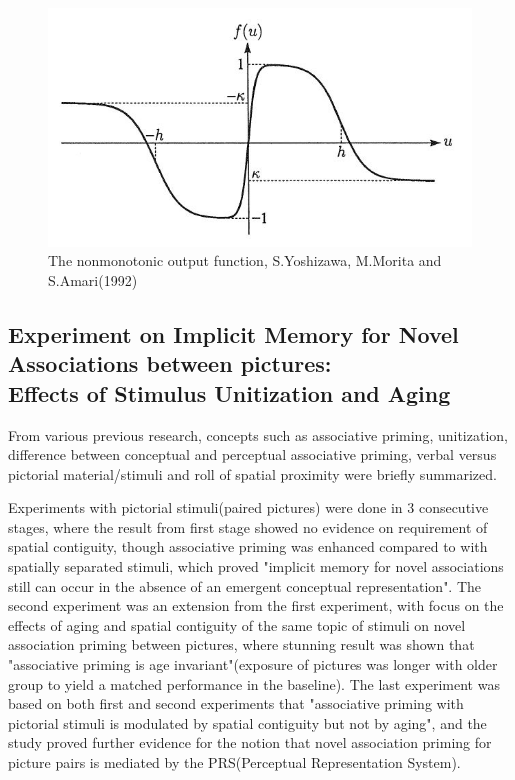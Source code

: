 \documentclass[12pt, a4paper]{article}
\begin{document}
\begin{figure}[h!]
\centering
\includegraphics[scale = 0.8]{nonmonotonic.JPG}
\caption{The nonmonotonic output function, S.Yoshizawa, M.Morita and S.Amari(1992)}
\label{fig:nonmonotonic}
\end{figure}



\subsection{Experiment on Implicit Memory for Novel Associations between pictures: \\ Effects of Stimulus Unitization and Aging\cite{stimulus_unitization_and_aging}}

From various previous research, concepts such as associative priming, unitization, difference between conceptual and perceptual associative priming, verbal versus pictorial material/stimuli and roll of spatial proximity were briefly summarized.


Experiments with pictorial stimuli(paired pictures) were done in 3 consecutive stages, where the result from first stage showed no evidence on requirement of spatial contiguity, though associative priming was enhanced compared to with spatially separated stimuli, which proved "implicit memory for novel associations still can occur in the absence of an emergent conceptual representation". The second experiment was an extension from the first experiment, with focus on the effects of aging and spatial contiguity of the same topic of stimuli on novel association priming between pictures, where stunning result was shown that "associative priming is age invariant"(exposure of pictures was longer with older group to yield a matched performance in the baseline). The last experiment was based on both first and second experiments that "associative priming with pictorial stimuli is modulated by spatial contiguity but not by aging", and the study proved further evidence for the notion that novel association priming for picture pairs is mediated by the PRS(Perceptual Representation System).
\end{document}
